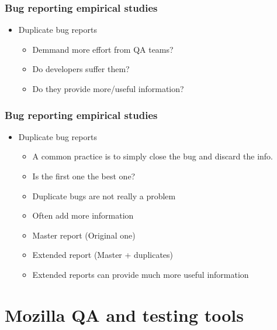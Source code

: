 \documentclass{beamer}
\begin{document}

\begin{frame}
 \frametitle{Bug reporting empirical studies}
 \begin{itemize}
    \item Duplicate bug reports
       \begin{itemize}
       \item Demmand more effort from QA teams?
       \item Do developers suffer them?
       \item Do they provide more/useful information?
       \end{itemize}
 \end{itemize}
\end{frame}

\begin{frame}
 \frametitle{Bug reporting empirical studies}
 \begin{itemize}
    \item Duplicate bug reports
       \begin{itemize}
       \item A common practice is to simply close the bug and discard the info.
       \item Is the first one the best one?
       \item Duplicate bugs are not really a problem
       \item Often add more information
       \item Master report (Original one)
       \item Extended report (Master + duplicates)
       \item Extended reports can provide much more useful information
       \end{itemize}
 \end{itemize}
\end{frame}


\section{Mozilla QA and testing tools}

\end{document}
